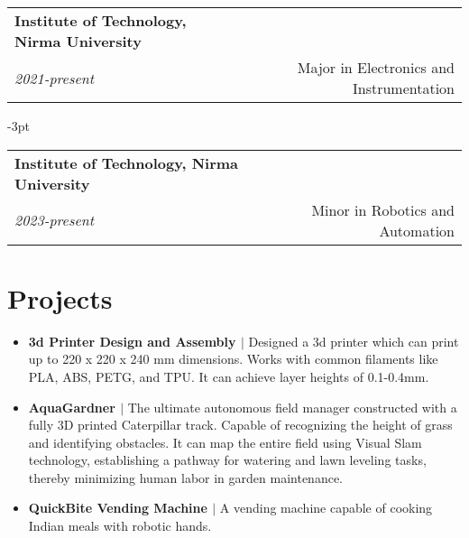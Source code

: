 \documentclass[a4paper,11pt]{article}
\makeatletter
\newcommand{\resumeSubheading}[4]{
\vspace{0.5mm}\item
    \begin{tabular*}{0.98\textwidth}[t]{l@{\extracolsep{\fill}}r}
        \textbf{#1} & \textit{\footnotesize{#4}} \\
        \textit{\footnotesize{#3}} &  \footnotesize{#2}\\
    \end{tabular*}
    \vspace{-2.4mm}
}
\newcommand{\resumeSubHeadingListStart}{\begin{itemize}[leftmargin=*,labelsep=0mm]}
\newcommand{\resumeItemListStart}{\begin{justify}\begin{itemize}[leftmargin=3ex, rightmargin=2ex, noitemsep,labelsep=1.2mm,itemsep=0mm]\small}
\newcommand{\resumeSubHeadingListEnd}{\end{itemize}\vspace{2mm}}
\newcommand{\resumeItemListEnd}{\end{itemize}\end{justify}\vspace{-2mm}}
\makeatother
\begin{document}
{  \resumeSubheading
      {Institute of Technology, Nirma University}   {Major in Electronics and Instrumentation}{2021-present}
     
      \vspace{-3pt}

    \resumeSubheading
      {Institute of Technology, Nirma University}
      {Minor in Robotics and Automation}{2023-present}
       
  \resumeSubHeadingListEnd







\section{Projects}

    \resumeSubHeadingListStart

    \resumeItemListStart
        \item{\textbf{3d Printer Design and Assembly $|$} Designed a 3d printer which can print up to 220 x 220 x 240 mm dimensions. Works with common filaments like PLA, ABS, PETG, and TPU. It can achieve layer heights of 0.1-0.4mm.}

        \item{\textbf{AquaGardner $|$} The ultimate autonomous field manager constructed with a fully 3D printed Caterpillar track. Capable of recognizing the height of grass and identifying obstacles. It can map the entire field using Visual Slam technology, establishing a pathway for watering and lawn leveling tasks, thereby minimizing human labor in garden maintenance.}

        \item{\textbf{QuickBite Vending Machine $|$} A vending machine capable of cooking Indian meals with robotic hands.}
    \resumeItemListEnd

    \vspace{-8pt}

   
          \resumeItemListStart
           
            \resumeItemListEnd
            \vspace{-8pt}        
       

    \resumeSubHeadingListEnd

\vspace{-10pt}



}
\end{document}
